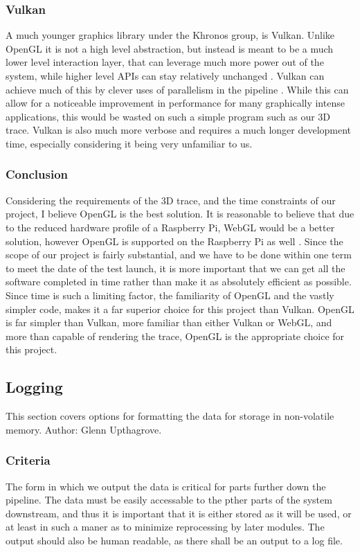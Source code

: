 \documentclass[onecolumn, draftclsnofoot,10pt, compsoc]{IEEEtran}
\begin{document}
\subsubsection{Vulkan}
A much younger graphics library under the Khronos group, is Vulkan. Unlike OpenGL it is not a high level abstraction, but instead is meant to be a much lower level interaction layer, that can leverage much more power out of the system, while higher level APIs can stay relatively unchanged \cite{refvulkan}. Vulkan can achieve much of this by clever uses of parallelism in the pipeline \cite{refvulkan}. While this can allow for a noticeable improvement in performance for many graphically intense applications, this would be wasted on such a simple program such as our 3D trace. Vulkan is also much more verbose and requires a much longer development time, especially considering it being very unfamiliar to us. 
\subsubsection{Conclusion}
Considering the requirements of the 3D trace, and the time constraints of our project, I believe OpenGL is the best solution. It is reasonable to believe that due to the reduced hardware profile of a Raspberry Pi, WebGL would be a better solution, however OpenGL is supported on the Raspberry Pi as well \cite{refpiii}. Since the scope of our project is fairly substantial, and we have to be done within one term to meet the date of the test launch, it is more important that we can get all the software completed in time rather than make it as absolutely efficient as possible. Since time is such a limiting factor, the familiarity of OpenGL and the vastly simpler code, makes it a far superior choice for this project than Vulkan. OpenGL is far simpler than Vulkan, more familiar than either Vulkan or WebGL, and more than capable of rendering the trace, OpenGL is the appropriate choice for this project\cite{refgs}. 

\subsection{Logging}
This section covers options for formatting the data for storage in non-volatile memory. Author: Glenn Upthagrove. 
\subsubsection{Criteria} 
The form in which we output the data is critical for parts further down the pipeline. The data must be easily accessable to the pther parts of the system downstream, and thus it is important that it is either stored as it will be used, or at least in such a maner as to minimize reprocessing by later modules. The output should also be human readable, as there shall be an output to a log file. 
\end{document}
